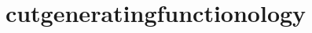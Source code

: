 \documentclass{article}
\date{}\author{}
\title{cutgeneratingfunctionology}
\begin{document}
\maketitle
\nocite{*}
\sloppy
\printbibliography
\end{document}
